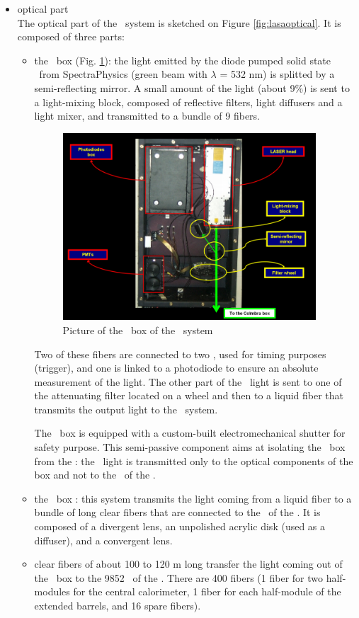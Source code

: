 \begin{itemize}
\item optical part \\
	The optical part of the \lasa~system is sketched on Figure \ref{fig:lasaoptical}. It is composed of three parts:
	\begin{itemize}
	\item the \las~box (Fig. \ref{fig:lasabox}): the light emitted by the diode pumped solid state \las~from SpectraPhysics (green beam with $\lambda$ = 532 nm) is splitted by a semi-reflecting mirror. A small amount of the light (about 9\%) is sent to a light-mixing block, composed of reflective filters, light diffusers and a light mixer, and transmitted to a bundle of 9 fibers. \par
		\begin{figure}[htbp]
			\centering
			\includegraphics[height=7cm]{figures/LaserBox.png}
			\caption{Picture of the \las~box of the \lasa~system}\label{fig:lasabox}
		\end{figure}	
			
		Two of these fibers are connected to two \pmts, used for timing purposes (trigger), and one is linked to a photodiode to ensure an absolute measurement of the light. The other part of the \las~light is sent to one of the attenuating filter located on a wheel and then to a liquid fiber that transmits the output light to the \coimbra~system. \par
                 The \las~box is equipped with a custom-built electromechanical shutter for safety purpose. This semi-passive component aims at isolating the \las~box from the \tilecal: the \las~light is transmitted only to the optical components of the box and not to the \pmt~of the \tilecal. 

	\item the \coimbra~box : this system transmits the light coming from a liquid fiber to a bundle of long clear fibers that are connected to the \pmts~of the \tilecal. It is composed of a divergent lens, an unpolished acrylic disk (used as a diffuser), and a convergent lens.
	\item clear fibers of about 100 to 120 m long transfer the light coming out of the \coimbra~box to the 9852 \pmts~of the \tilecal. There are 400 fibers (1 fiber for two half-modules for the central calorimeter, 1 fiber for each half-module of the extended barrels, and 16 spare fibers). 
	\end{itemize}
		

\end{itemize}
